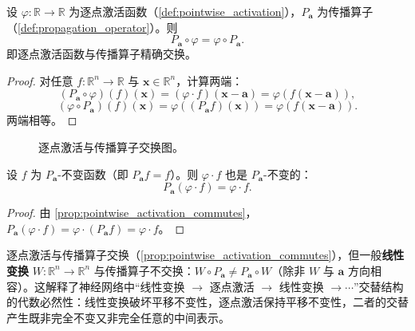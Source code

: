 \begin{proposition}[逐点激活与传播算子的交换性]\label{prop:pointwise_activation_commutes}
设 $\varphi:\mathbb{R}\to\mathbb{R}$ 为逐点激活函数（\cref{def:pointwise_activation}），$P_{\mathbf{a}}$ 为传播算子（\cref{def:propagation_operator}）。则
\[
\boxed{\ P_{\mathbf{a}}\circ\varphi = \varphi\circ P_{\mathbf{a}}.\ }
\]
即逐点激活函数与传播算子精确交换。
\end{proposition}

\begin{proof}
对任意 $f:\mathbb{R}^n\to\mathbb{R}$ 与 $\mathbf{x}\in\mathbb{R}^n$，计算两端：
\[
(P_{\mathbf{a}}\circ\varphi)(f)(\mathbf{x}) = (\varphi\cdot f)(\mathbf{x}-\mathbf{a}) = \varphi(f(\mathbf{x}-\mathbf{a})),
\]
\[
(\varphi\circ P_{\mathbf{a}})(f)(\mathbf{x}) = \varphi((P_{\mathbf{a}}f)(\mathbf{x})) = \varphi(f(\mathbf{x}-\mathbf{a})).
\]
两端相等。
\end{proof}

\begin{figure}[htbp]
\centering
{}
\caption{逐点激活与传播算子交换图。}
\label{fig:pointwise_commute}
\end{figure}

\begin{corollary}[逐点激活保持平移不变性]\label{cor:pointwise_preserves_translation}
设 $f$ 为 $P_{\mathbf{a}}$-不变函数（即 $P_{\mathbf{a}}f = f$）。则 $\varphi\cdot f$ 也是 $P_{\mathbf{a}}$-不变的：
\[
P_{\mathbf{a}}(\varphi\cdot f) = \varphi\cdot f.
\]
\end{corollary}

\begin{proof}
由 \cref{prop:pointwise_activation_commutes}，$P_{\mathbf{a}}(\varphi\cdot f) = \varphi\cdot(P_{\mathbf{a}}f) = \varphi\cdot f$。
\end{proof}

\begin{remark}[线性变换破坏平移不变性]\label{rem:linear_transform_breaks_translation}
逐点激活与传播算子交换（\cref{prop:pointwise_activation_commutes}），但一般\textbf{线性变换} $W:\mathbb{R}^n\to\mathbb{R}^n$ 与传播算子不交换：$W\circ P_{\mathbf{a}}\neq P_{\mathbf{a}}\circ W$（除非 $W$ 与 $\mathbf{a}$ 方向相容）。这解释了神经网络中“线性变换 $\to$ 逐点激活 $\to$ 线性变换 $\to\cdots$”交替结构的代数必然性：线性变换破坏平移不变性，逐点激活保持平移不变性，二者的交替产生既非完全不变又非完全任意的中间表示。
\end{remark}

